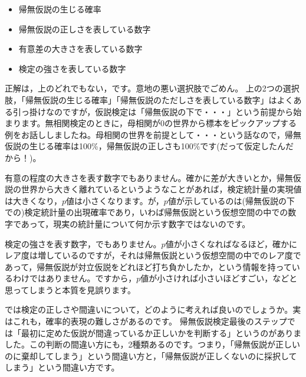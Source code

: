 \documentclass{ltjsarticle}
\begin{document}
\begin{itemize}
    \item 帰無仮説の生じる確率
    \item 帰無仮説の正しさを表している数字
    \item 有意差の大きさを表している数字
    \item 検定の強さを表している数字
\end{itemize}

正解は，上のどれでもない，です。意地の悪い選択肢でごめん。
上の2つの選択肢，「帰無仮説の生じる確率」「帰無仮説のただしさを表している数字」はよくある引っ掛けなのですが，仮説検定は「帰無仮説の下で・・・」という前提から始まります。無相関検定のときに，母相関が0の世界から標本をピックアップする例をお話ししましたね。母相関の世界を前提として・・・という話なので，帰無仮説の生じる確率は100\%，帰無仮説の正しさも100\%です(だって仮定したんだから！)。

有意の程度の大きさを表す数字でもありません。確かに差が大きいとか，帰無仮説の世界から大きく離れているというようなことがあれば，検定統計量の実現値は大きくなり，$p$値は小さくなります。が，$p$値が示しているのは(帰無仮説の下での)検定統計量の出現確率であり，いわば帰無仮説という仮想空間の中での数字であって，現実の統計量について何か示す数字ではないのです。

検定の強さを表す数字，でもありません。$p$値が小さくなればなるほど，確かにレア度は増しているのですが，それは帰無仮説という仮想空間の中でのレア度であって，帰無仮説が対立仮説をどれほど打ち負かしたか，という情報を持っているわけではありません。ですから，$p$値が小さければ小さいほどすごい，などと思ってしまうと本質を見誤ります。

では検定の正しさや間違いについて，どのように考えれば良いのでしょうか。実はこれも，確率的表現の難しさがあるのです。
帰無仮説検定最後のステップでは「最初に定めた仮説が間違っているか正しいかを判断する」というのがありました。この判断の間違い方にも，2種類あるのです。つまり，「帰無仮説が正しいのに棄却してしまう」という間違い方と，「帰無仮説が正しくないのに採択してしまう」という間違い方です。
\end{document}
